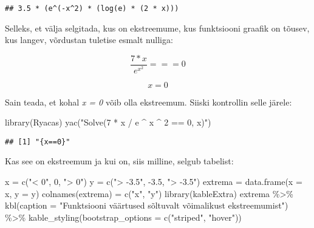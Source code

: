 \documentclass[
]{article}
\newenvironment{Shaded}{\begin{snugshade}}{\end{snugshade}}
\newcommand{\AttributeTok}[1]{\textcolor[rgb]{0.77,0.63,0.00}{#1}}
\newcommand{\DecValTok}[1]{\textcolor[rgb]{0.00,0.00,0.81}{#1}}
\newcommand{\FloatTok}[1]{\textcolor[rgb]{0.00,0.00,0.81}{#1}}
\newcommand{\FunctionTok}[1]{\textcolor[rgb]{0.00,0.00,0.00}{#1}}
\newcommand{\NormalTok}[1]{#1}
\newcommand{\OtherTok}[1]{\textcolor[rgb]{0.56,0.35,0.01}{#1}}
\newcommand{\SpecialCharTok}[1]{\textcolor[rgb]{0.00,0.00,0.00}{#1}}
\newcommand{\StringTok}[1]{\textcolor[rgb]{0.31,0.60,0.02}{#1}}
\begin{document}
\begin{verbatim}
## 3.5 * (e^(-x^2) * (log(e) * (2 * x)))
\end{verbatim}

Selleks, et välja selgitada, kus on ekstreemume, kus funktsiooni graafik on tõusev, kus langev, võrdustan tuletise esmalt nulliga:

\[\frac{7 * x}{ e ^ {x ^ 2}} === 0\]

\[x = 0\]

Sain teada, et kohal \emph{x = 0} võib olla ekstreemum. Siiski kontrollin selle järele:

\begin{Shaded}
\begin{Highlighting}[]
\FunctionTok{library}\NormalTok{(Ryacas)}
\FunctionTok{yac}\NormalTok{(}\StringTok{"Solve(7 * x / e \^{} x \^{} 2 == 0, x)"}\NormalTok{)}
\end{Highlighting}
\end{Shaded}

\begin{verbatim}
## [1] "{x==0}"
\end{verbatim}

Kas see on ekstreemum ja kui on, siis milline, selgub tabelist:

\begin{Shaded}
\begin{Highlighting}[]
\NormalTok{x }\OtherTok{=} \FunctionTok{c}\NormalTok{(}\StringTok{"\textless{} 0"}\NormalTok{, }\DecValTok{0}\NormalTok{, }\StringTok{"\textgreater{} 0"}\NormalTok{)}
\NormalTok{y }\OtherTok{=} \FunctionTok{c}\NormalTok{(}\StringTok{"\textgreater{} {-}3.5"}\NormalTok{, }\SpecialCharTok{{-}}\FloatTok{3.5}\NormalTok{, }\StringTok{"\textgreater{} {-}3.5"}\NormalTok{)}
\NormalTok{extrema }\OtherTok{=} \FunctionTok{data.frame}\NormalTok{(}\AttributeTok{x =}\NormalTok{ x, }\AttributeTok{y =}\NormalTok{ y)}
\FunctionTok{colnames}\NormalTok{(extrema) }\OtherTok{=} \FunctionTok{c}\NormalTok{(}\StringTok{"x"}\NormalTok{, }\StringTok{"y"}\NormalTok{)}
\FunctionTok{library}\NormalTok{(kableExtra)}
\NormalTok{extrema }\SpecialCharTok{\%\textgreater{}\%} \FunctionTok{kbl}\NormalTok{(}\AttributeTok{caption =} \StringTok{"Funktsiooni väärtused sõltuvalt võimalikust ekstreemumist"}\NormalTok{) }\SpecialCharTok{\%\textgreater{}\%} \FunctionTok{kable\_styling}\NormalTok{(}\AttributeTok{bootstrap\_options =} \FunctionTok{c}\NormalTok{(}\StringTok{"striped"}\NormalTok{, }\StringTok{"hover"}\NormalTok{))}
\end{Highlighting}
\end{Shaded}
\end{document}
